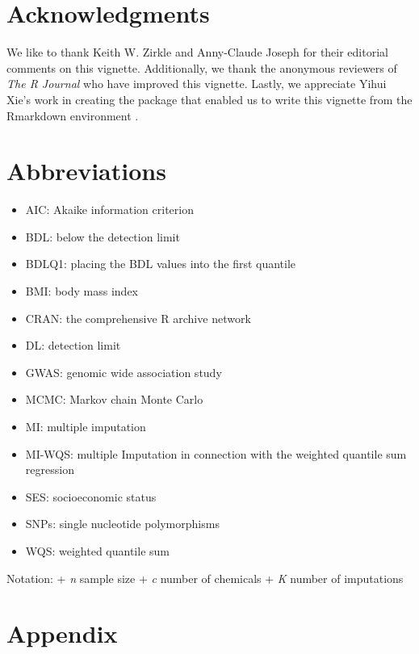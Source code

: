 \hypertarget{acknowledgments}{%
\section{Acknowledgments}\label{acknowledgments}}

We like to thank Keith W. Zirkle and Anny-Claude Joseph for their
editorial comments on this vignette. Additionally, we thank the
anonymous reviewers of \emph{The R Journal} who have improved this
vignette. Lastly, we appreciate Yihui Xie's work in creating the
 package that enabled us to write this vignette from
the Rmarkdown environment \citep{xieRticlesArticleFormats2020}.

\hypertarget{abbreviations}{%
\section{Abbreviations}\label{abbreviations}}

\begin{itemize}
\tightlist
\item
  AIC: Akaike information criterion
\item
  BDL: below the detection limit
\item
  BDLQ1: placing the BDL values into the first quantile
\item
  BMI: body mass index
\item
  CRAN: the comprehensive R archive network
\item
  DL: detection limit
\item
  GWAS: genomic wide association study
\item
  MCMC: Markov chain Monte Carlo
\item
  MI: multiple imputation
\item
  MI-WQS: multiple Imputation in connection with the weighted quantile
  sum regression
\item
  SES: socioeconomic status
\item
  SNPs: single nucleotide polymorphisms
\item
  WQS: weighted quantile sum
\end{itemize}

Notation: + \emph{n} sample size + \emph{c} number of chemicals +
\emph{K} number of imputations

\hypertarget{appendix}{%
\section{Appendix}\label{appendix}}

